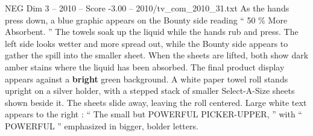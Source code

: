 \begin{textsample}{NEG Dim 3 – 2010 – Score -3.00 – 2010/tv\_com\_2010\_31.txt}
As the hands press down, a blue graphic appears on the Bounty side reading “ 50 \% More Absorbent. ” The towels soak up the liquid while the hands rub and press.
The left side looks wetter and more spread out, while the Bounty side appears to gather the spill into the smaller sheet.
When the sheets are lifted, both show dark amber stains where the liquid has been absorbed.
The final product display appears against a \textbf{bright} green background.
A white paper towel roll stands upright on a silver holder, with a stepped stack of smaller Select-A-Size sheets shown beside it.
The sheets slide away, leaving the roll centered.
Large white text appears to the right : “ The small but POWERFUL PICKER-UPPER, ” with “ POWERFUL ” emphasized in bigger, bolder letters.

\end{textsample}
